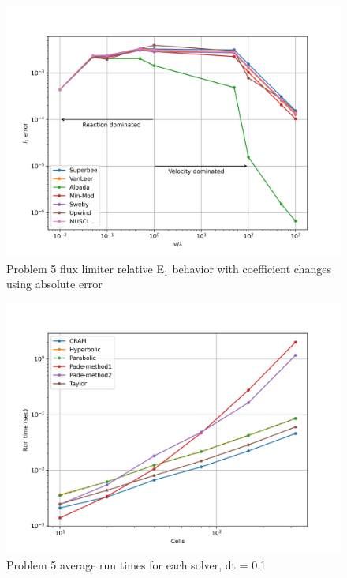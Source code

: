 \begin{figure}[p]
    \centering
    \includegraphics[width=6in]{images/chapter-5/progressionProblems/problem5/problem5CoefficientChanges.png}
    \caption{Problem 5 flux limiter relative E${}_{1}$ behavior with coefficient changes using absolute error}
    \label{fig:problem5_l1error_coefficient_changes}
\end{figure}

\clearpage

\begin{figure}[p]
    \centering
    \includegraphics[width=6in]{images/chapter-5/progressionProblems/problem5/problem5Runtimes.png}
    \caption{Problem 5 average run times for each solver, dt = 0.1}
    \label{fig:problem5_runtimes}
\end{figure}

